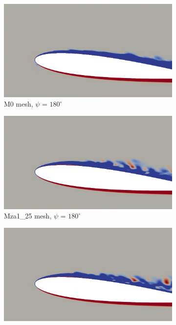 


\begin{figure}[H]
	\centering
	\begin{center}
	\begin{subfigure}[b]{0.475\textwidth}
		\centering
		\includegraphics[width=1\textwidth]{figures/zonal_adapt_results/vorticity_plots/v2/M0/spavg/phase_180.png}
		\caption{M0 mesh, $\psi$ = $180^\circ$}
		\label{fig:M0_sp_psi180}
	\end{subfigure}
	\end{center}
	\begin{subfigure}[b]{0.475\textwidth}
	\centering
	\includegraphics[width=1\textwidth]{figures/zonal_adapt_results/vorticity_plots/v2/Mza1_25/spavg/phase_180.png}
	\caption{Mza1\_25 mesh, $\psi$ = $180^\circ$}
	\label{fig:Mza1_25_sp_psi180}
\end{subfigure}
	\begin{subfigure}[b]{0.475\textwidth}
		\centering
		\includegraphics[width=1\textwidth]{figures/zonal_adapt_results/vorticity_plots/v2/Mza1_50/spavg/phase_180.png}

\end{subfigure}
\end{figure}
